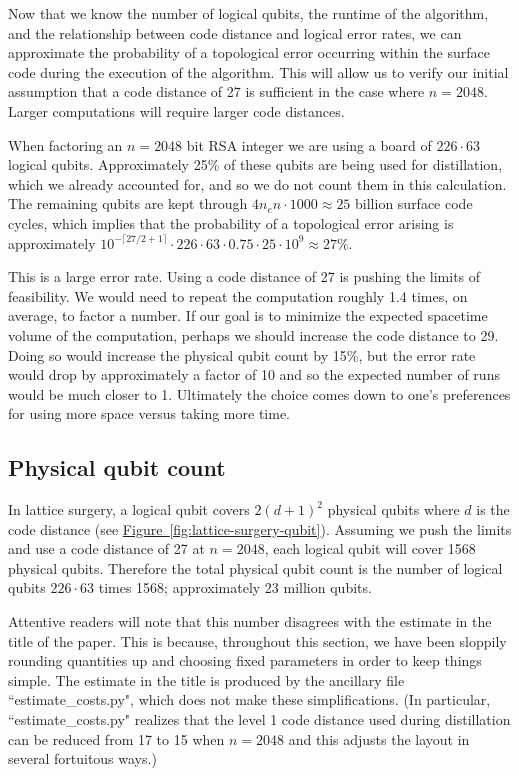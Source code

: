 \documentclass[a4paper, onecolumn, accepted=2021-03-29]{quantumarticle}
\newcommand{\fig}[1]{\hyperref[fig:#1]{Figure~\ref*{fig:#1}}}
\newcommand{\lenexp}{{n_e}}
\begin{document}
Now that we know the number of logical qubits, the runtime of the algorithm, and the relationship between code distance and logical error rates, we can approximate the probability of a topological error occurring within the surface code during the execution of the algorithm.
This will allow us to verify our initial assumption that a code distance of 27 is sufficient in the case where $n=2048$.
Larger computations will require larger code distances.

When factoring an $n=2048$ bit RSA integer we are using a board of $226 \cdot 63$ logical qubits.
Approximately 25\% of these qubits are being used for distillation, which we already accounted for, and so we do not count them in this calculation.
The remaining qubits are kept through $4 \lenexp n \cdot 1000 \approx 25$ billion surface code cycles, which implies that the probability of a topological error arising is approximately $10^{-\lceil 27/2+1 \rceil} \cdot 226 \cdot 63 \cdot 0.75 \cdot 25 \cdot 10^9 \approx 27\%$.

This is a large error rate.
Using a code distance of 27 is pushing the limits of feasibility.
We would need to repeat the computation roughly 1.4 times, on average, to factor a number.
If our goal is to minimize the expected spacetime volume of the computation, perhaps we should increase the code distance to 29.
Doing so would increase the physical qubit count by 15\%, but the error rate would drop by approximately a factor of 10 and so the expected number of runs would be much closer to 1.
Ultimately the choice comes down to one's preferences for using more space versus taking more time.


\subsection{Physical qubit count}

In lattice surgery, a logical qubit covers $2(d+1)^2$ physical qubits where $d$ is the code distance (see \fig{lattice-surgery-qubit}).
Assuming we push the limits and use a code distance of 27 at $n=2048$, each logical qubit will cover 1568 physical qubits.
Therefore the total physical qubit count is the number of logical qubits $226 \cdot 63$ times 1568; approximately 23 million qubits.

Attentive readers will note that this number disagrees with the estimate in the title of the paper.
This is because, throughout this section, we have been sloppily rounding quantities up and choosing fixed parameters in order to keep things simple.
The estimate in the title is produced by the ancillary file ``estimate\_costs.py", which does not make these simplifications.
(In particular, ``estimate\_costs.py" realizes that the level 1 code distance used during distillation can be reduced from 17 to 15 when $n=2048$ and this adjusts the layout in several fortuitous ways.)
\end{document}
